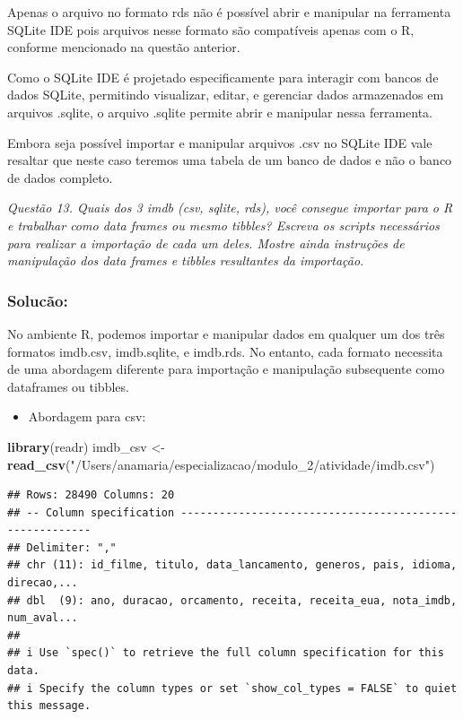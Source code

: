 \documentclass[
]{article}
\newenvironment{Shaded}{\begin{snugshade}}{\end{snugshade}}
\newcommand{\FunctionTok}[1]{\textcolor[rgb]{0.13,0.29,0.53}{\textbf{#1}}}
\newcommand{\NormalTok}[1]{#1}
\newcommand{\OtherTok}[1]{\textcolor[rgb]{0.56,0.35,0.01}{#1}}
\newcommand{\StringTok}[1]{\textcolor[rgb]{0.31,0.60,0.02}{#1}}
\providecommand{\tightlist}{%
  \setlength{\itemsep}{0pt}\setlength{\parskip}{0pt}}
\begin{document}
Apenas o arquivo no formato rds não é possível abrir e manipular na
ferramenta SQLite IDE pois arquivos nesse formato são compatíveis apenas
com o R, conforme mencionado na questão anterior.

Como o SQLite IDE é projetado especificamente para interagir com bancos
de dados SQLite, permitindo visualizar, editar, e gerenciar dados
armazenados em arquivos .sqlite, o arquivo .sqlite permite abrir e
manipular nessa ferramenta.

Embora seja possível importar e manipular arquivos .csv no SQLite IDE
vale resaltar que neste caso teremos uma tabela de um banco de dados e
não o banco de dados completo.

\emph{Questão 13. Quais dos 3 imdb (csv, sqlite, rds), você consegue
importar para o R e trabalhar como data frames ou mesmo tibbles? Escreva
os scripts necessários para realizar a importação de cada um deles.
Mostre ainda instruções de manipulação dos data frames e tibbles
resultantes da importação.}

\subsubsection{Solucão:}\label{solucuxe3o}

No ambiente R, podemos importar e manipular dados em qualquer um dos
três formatos imdb.csv, imdb.sqlite, e imdb.rds. No entanto, cada
formato necessita de uma abordagem diferente para importação e
manipulação subsequente como dataframes ou tibbles.

\begin{itemize}
\tightlist
\item
  Abordagem para csv:
\end{itemize}

\begin{Shaded}
\begin{Highlighting}[]
\FunctionTok{library}\NormalTok{(readr)}
\NormalTok{imdb\_csv }\OtherTok{\textless{}{-}} \FunctionTok{read\_csv}\NormalTok{(}\StringTok{"/Users/anamaria/especializacao/modulo\_2/atividade/imdb.csv"}\NormalTok{)}
\end{Highlighting}
\end{Shaded}

\begin{verbatim}
## Rows: 28490 Columns: 20
## -- Column specification --------------------------------------------------------
## Delimiter: ","
## chr (11): id_filme, titulo, data_lancamento, generos, pais, idioma, direcao,...
## dbl  (9): ano, duracao, orcamento, receita, receita_eua, nota_imdb, num_aval...
## 
## i Use `spec()` to retrieve the full column specification for this data.
## i Specify the column types or set `show_col_types = FALSE` to quiet this message.
\end{verbatim}
\end{document}
